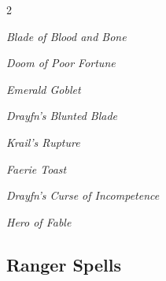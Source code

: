 \documentclass[10pt,a4paper,twoside,bg=print,twocolumn,openany,nodeprecatedcode]{dndbook}
\begin{document}
\begin{description}
\begin{multicols}{2}
{\par \vspace { 9pt plus 3pt minus 3pt } \noindent  {} \nopagebreak }

\begin{description}
\item \textit{Blade of Blood and Bone}
\item \textit{Doom of Poor Fortune}
\item \textit{Emerald Goblet}
\end{description}

{\par \vspace { 9pt plus 3pt minus 3pt } \noindent  {} \nopagebreak }

\begin{description}
\item \textit{Drayfn's Blunted Blade}
\item \textit{Krail's Rupture}
\end{description}

{\par \vspace { 9pt plus 3pt minus 3pt } \noindent  {} \nopagebreak }

\begin{description}
\item \textit{Faerie Toast}
\end{description}

{\par \vspace { 9pt plus 3pt minus 3pt } \noindent  {} \nopagebreak }

\begin{description}
\item \textit{Drayfn's Curse of Incompetence}
\end{description}

{\par \vspace { 9pt plus 3pt minus 3pt } \noindent  {} \nopagebreak }

\begin{description}
\item \textit{Hero of Fable}
\end{description}

\end{multicols}

\end{description}

\subsection{Ranger Spells}
\end{document}
